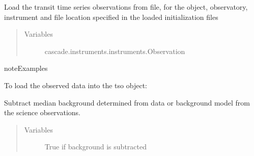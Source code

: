 \documentclass[a4paper,11pt,english]{sphinxmanual}
\begin{document}
\begin{fulllineitems}
\begin{fulllineitems}
\end{fulllineitems}


\begin{fulllineitems}
\label{\detokenize{cascade.TSO:cascade.TSO.TSO.TSOSuite.load_data}}
Load the transit time series observations from file, for the
object, observatory, instrument and file location specified in the
loaded initialization files
\begin{quote}\begin{description}
\item[{Variables}] \leavevmode
{} \textendash{} cascade.instruments.instruments.Observation

\end{description}\end{quote}

\begin{sphinxadmonition}{note}{Examples}

To load the observed data into the tso object:

%
\begin{sphinxVerbatim}[commandchars=\\\{\}]
\end{sphinxVerbatim}
\end{sphinxadmonition}

\end{fulllineitems}


\begin{fulllineitems}
\label{\detokenize{cascade.TSO:cascade.TSO.TSO.TSOSuite.subtract_background}}
Subtract median background determined from data or background model
from the science observations.
\begin{quote}\begin{description}
\item[{Variables}] \leavevmode
{} \textendash{} True if background is subtracted


\end{description}
\end{quote}
\end{fulllineitems}
\end{fulllineitems}
\end{document}

